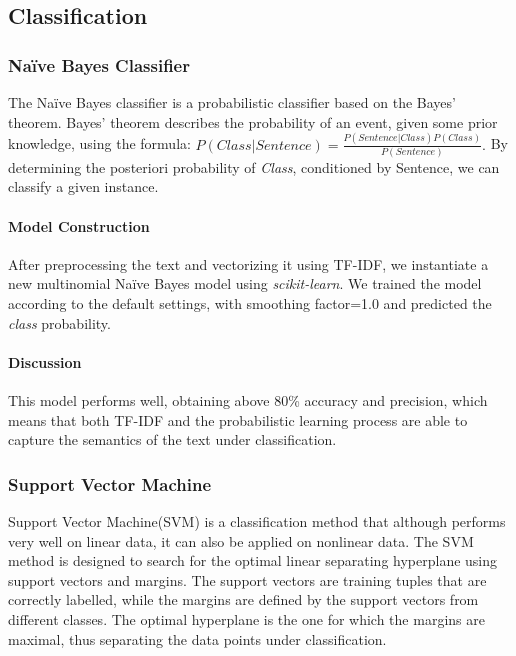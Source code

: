
\subsection{Classification}\label{classification}
\subsubsection{Naïve Bayes Classifier}
The Naïve Bayes classifier is a probabilistic classifier based on the Bayes' theorem.
Bayes' theorem describes the probability of an event, given some prior knowledge, using the formula:
$P(Class|Sentence)=\frac{P(Sentence|Class)P(Class)}{P(Sentence)}.$
By determining the posteriori probability of \textit{Class}, conditioned by Sentence, we can classify a given instance.

\paragraph{Model Construction}
After preprocessing the text and vectorizing it using TF-IDF, we instantiate a new multinomial Naïve Bayes model using \textit{scikit-learn}\cite{scikit-learn}. We trained the model according to the default settings, with smoothing factor=1.0 and predicted the \textit{class} probability.

\paragraph{Discussion}
This model performs well, obtaining above 80\% accuracy and precision, which means that both TF-IDF and the probabilistic learning process are able to capture the semantics of the text under classification.

\subsubsection{Support Vector Machine}
Support Vector Machine(SVM) is a classification method that although performs very well on linear data, it can also be applied on nonlinear data. The SVM method is designed to search for the optimal linear separating hyperplane using support vectors and margins. The support vectors are training tuples that are correctly labelled, while the margins are defined by the support vectors from different classes. The optimal hyperplane is the one for which the margins are maximal, thus separating the data points under classification.


